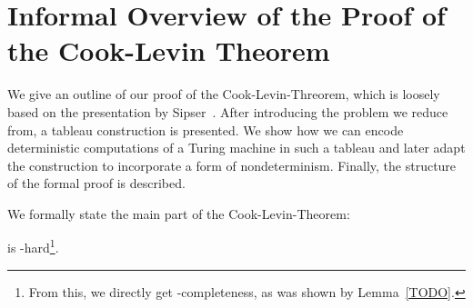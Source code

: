 \newcommand*{\gennp}{\textbf{TMGenNP}}

\newcommand{\strent}{\rightsquigarrow}
\newcommand{\Rfinal}{R_{\text{final}}}

\newcommand{\bigO}[1]{\mathcal{O}{(#1)}}

\newcommand{\BPR}{\textbf{BinaryPR}}
\newcommand{\fsat}{\textbf{FSAT}}
\newcommand{\sat}{\textbf{SAT}}

\newcommand{\rewwin}[2]{
  \begin{tabular}{C|C|C}
    #1 \\ 
    \midrule #2
  \end{tabular}
}

\newcommand{\blank}{\textbf{\textvisiblespace}}
\newcommand{\delim}{\#}

\newcommand{\polarity}{\textsf{polarity}}


\newcommand*{\TallestContent}{\ensuremath{b}}%

\newcommand{\polneg}[1]{\overleftarrow{#1\vphantom{\TallestContent}}}
\newcommand{\polpos}[1]{\overrightarrow{#1\vphantom{\TallestContent}}}
\newcommand{\polneut}[1]{\overline{#1\vphantom{\TallestContent}}}

\newcommand{\reprt}[1]{\ensuremath{\sim_t^{#1}}}
\newcommand{\reprtt}[2]{\ensuremath{\sim_t^{(#1, #2)}}}
\newcommand{\reprc}{\ensuremath{\sim_c}}



\chapter{Informal Overview of the Proof of the Cook-Levin Theorem}\label{chap:informaloverview}
We give an outline of our proof of the Cook-Levin-Threorem, which is loosely based on the presentation by Sipser~\cite{Sipser:TheoryofComputation}. After introducing the problem we reduce from, a tableau construction is presented. We show how we can encode deterministic computations of a Turing machine in such a tableau and later adapt the construction to incorporate a form of nondeterminism. Finally, the structure of the formal proof is described. 

We formally state the main part of the Cook-Levin-Theorem:
\begin{theorem}
  \SAT{} is \NP{}-hard\footnote{From this, we directly get \NP{}-completeness, as was shown by Lemma~\ref{TODO}.}.
\end{theorem}

